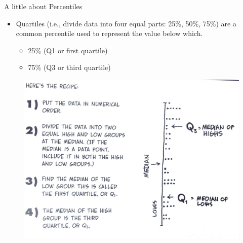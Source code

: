 \documentclass[
  ignorenonframetext,
]{beamer}
\providecommand{\tightlist}{%
  \setlength{\itemsep}{0pt}\setlength{\parskip}{0pt}}
\begin{document}
\begin{frame}{A little about Percentiles}
\label{a-little-about-percentiles}
\begin{itemize}
\tightlist
\item
  Quartiles (i.e., divide data into four equal parts: 25\%, 50\%, 75\%)
  are a common percentile used to represent the value below which.

  \begin{itemize}
  \tightlist
  \item
    25\% (Q1 or first quartile)\\
  \item
    75\% (Q3 or third quartile)
  \end{itemize}
\end{itemize}

\begin{figure}
\includegraphics[width=0.4\linewidth]{fig/quartiles} \end{figure}
\end{frame}
\end{document}
